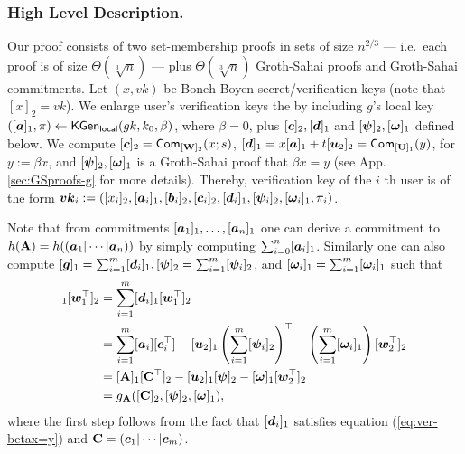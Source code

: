 \subsubsection{High Level Description.} %
%
Our proof consists of two set-membership proofs in sets of size $n^{2/3}$ --- i.e.~each proof is of size $\Theta(\sqrt[3]{n})$ ---  plus $\Theta(\sqrt[3]{n})$ Groth-Sahai proofs and Groth-Sahai commitments.
Let $(x,vk)$ be Boneh-Boyen secret/verification keys (note that $[x]_2=vk$).
We enlarge user's verification keys the by including $g$'s local key $([{\boldsymbol{a}}]_1, \pi)\gets \mathsf{KGen}_{\mathsf{local}}(gk,k_0,\beta)$, where $\beta=0$, plus $[{\boldsymbol{c}}]_2,[{\boldsymbol{d}}]_1$ and $[{\boldsymbol{\psi}}]_2,[{\boldsymbol{\omega}}]_1$ defined below. 
We compute $[{\boldsymbol{c}}]_2=\mathsf{Com}_{[\mathbf{{W}}]_2}(x;s)$, $[{\boldsymbol{d}}]_1 = x[{\boldsymbol{a}}]_1+t[{\boldsymbol{u}}_2]_2=\mathsf{Com}_{[\mathbf{{U}}]_1}(y)$, for $y:=\beta x$, and $[{\boldsymbol{\psi}}]_2,[{\boldsymbol{\omega}}]_1$ is a Groth-Sahai proof that $\beta x = y$ (see App. \ref{sec:GSproofs-g} for more details). Thereby, verification key of the $i$ th user is of the form ${\boldsymbol{vk}}_i:=([x_i]_2,[{\boldsymbol{a}}_i]_1,[{\boldsymbol{b}}_i]_2,[{\boldsymbol{c}}_i]_2,[{\boldsymbol{d}}_i]_1,[{\boldsymbol{\psi}}_i]_2,[{\boldsymbol{\omega}}_i]_1,\pi_i)$.

Note that from commitments $[{\boldsymbol{a}}_1]_1,\ldots,[{\boldsymbol{a}}_n]_1$ one can derive a commitment to $h(\mathbf{{A}})=h(({\boldsymbol{a}}_1|\cdots|{\boldsymbol{a}}_n))$ by simply computing $\sum_{i=0}^n [{\boldsymbol{a}}_i]_1$. Similarly one can also compute $[{\boldsymbol{g}}]_1 = \sum_{i=1}^m[{\boldsymbol{d}}_i]_1,[{\boldsymbol{\psi}}]_2 = \sum_{i=1}^m [{\boldsymbol{\psi}}_i]_2$, and $[{\boldsymbol{\omega}}_i]_1 = \sum_{i=1}^m [{\boldsymbol{\omega}}_i]_1$ such that
\begin{align*}
[\vecb{g}]_1[\vecb{w}_1^\top]_2 &= \sum_{i=1}^m [\vecb{d}_i]_1[\vecb{w}_1^\top]_2\\
&= \sum_{i=1}^m [\vecb{a}_i][\vecb{c}_i^\top] - [\vecb{u}_2]_1\left(\sum_{i=1}^m[\vecb{\psi}_i]_2\right)^\top  -\left(\sum_{i=1}^m[\vecb{\omega}_i]_1\right)[\vecb{w}_2^\top]_2\\
&= [\matr{A}]_1[\matr{C}^\top]_2 - [\vecb{u}_2]_1[\vecb{\psi}]_2 - [\vecb{\omega}]_1[\vecb{w}_2^\top]_2\\
&= g_{\matr{A}}([\matr{C}]_2,[\vecb{\psi}]_2,[\vecb{\omega}]_1),
\end{align*}
where the first step follows from the fact that $[{\boldsymbol{d}}_i]_1$ satisfies equation (\ref{eq:ver-betax=y}) and $\mathbf{{C}}=({\boldsymbol{c}}_1|\cdots|{\boldsymbol{c}}_m)$. %

